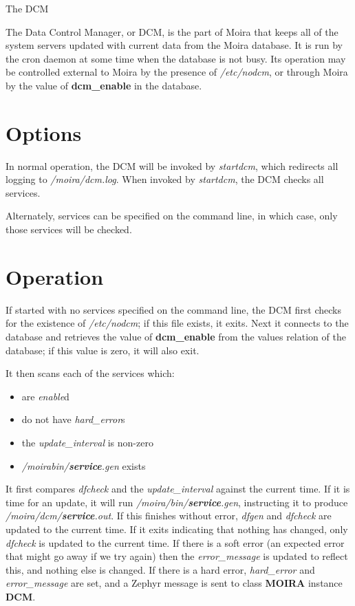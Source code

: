 \documentclass{article}
\begin{document}
\begin{center}
{\Large The DCM}
\end{center}

The Data Control Manager, or DCM, is the part of Moira that keeps all
of the system servers updated with current data from the Moira
database. It is run by the cron daemon at some time when the database
is not busy. Its operation may be controlled external to Moira by the
presence of {\it /etc/nodcm}, or through Moira by the value of {\bf
dcm\_enable} in the database.

\section{Options}

In normal operation, the DCM will be invoked by {\it startdcm}, which
redirects all logging to {\it /moira/dcm.log}. When invoked by {\it
startdcm}, the DCM checks all services.

Alternately, services can be specified on the command line, in which
case, only those services will be checked.

\section{Operation}

If started with no services specified on the command line, the DCM
first checks for the existence of {\it /etc/nodcm}; if this file
exists, it exits. Next it connects to the database and retrieves the
value of {\bf dcm\_enable} from the values relation of the database; if
this value is zero, it will also exit.

It then scans each of the services which:

\begin{itemize}
\item are {\it enable\/}d
\item do not have {\it hard\_error\/}s
\item the {\it update\_interval\/} is non-zero
\item {\it /moirabin/{\bf service}.gen\/} exists
\end{itemize}

It first compares {\it dfcheck\/} and the {\it update\_interval\/}
against the current time. If it is time for an update, it will run
{\it /moira/bin/{\bf service}.gen}, instructing it to produce {\it
/moira/dcm/{\bf service}.out}. If this finishes without error, {\it
dfgen} and {\it dfcheck} are updated to the current time. If it exits
indicating that nothing has changed, only {\it dfcheck} is updated to
the current time. If there is a soft error (an expected error that
might go away if we try again) then the {\it error\_message} is
updated to reflect this, and nothing else is changed. If there is a
hard error, {\it hard\_error} and {\it error\_message} are set, and a
Zephyr message is sent to class {\bf MOIRA} instance {\bf DCM}.
\end{document}
